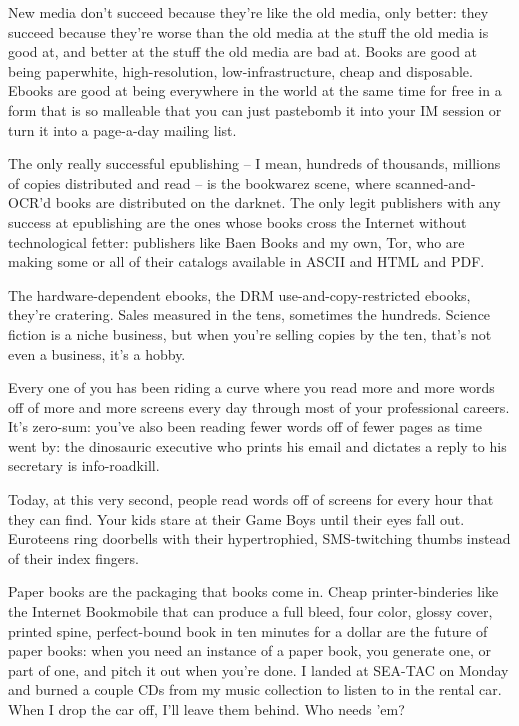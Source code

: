 New media don't succeed because they're like the old media, only
better: they succeed because they're worse than the old media at
the stuff the old media is good at, and better at the stuff the old
media are bad at. Books are good at being paperwhite,
high-resolution, low-infrastructure, cheap and disposable. Ebooks
are good at being everywhere in the world at the same time for free
in a form that is so malleable that you can just pastebomb it into
your IM session or turn it into a page-a-day mailing list.

The only really successful epublishing -- I mean, hundreds of
thousands, millions of copies distributed and read -- is the
bookwarez scene, where scanned-and-OCR'd books are distributed on
the darknet. The only legit publishers with any success at
epublishing are the ones whose books cross the Internet without
technological fetter: publishers like Baen Books and my own, Tor,
who are making some or all of their catalogs available in ASCII and
HTML and PDF.

The hardware-dependent ebooks, the DRM use-and-copy-re\-stricted
ebooks, they're cratering. Sales measured in the tens, sometimes
the hundreds. Science fiction is a niche business, but when you're
selling copies by the ten, that's not even a business, it's a
hobby.

Every one of you has been riding a curve where you read more and
more words off of more and more screens every day through most of
your professional careers. It's zero-sum: you've also been reading
fewer words off of fewer pages as time went by: the dinosauric
executive who prints his email and dictates a reply to his
secretary is info-roadkill.

Today, at this very second, people read words off of screens for
every hour that they can find. Your kids stare at their Game Boys
until their eyes fall out. Euroteens ring doorbells with their
hypertrophied, SMS-twitching thumbs instead of their index
fingers.

Paper books are the packaging that books come in. Cheap
printer-binderies like the Internet Bookmobile that can produce a
full bleed, four color, glossy cover, printed spine, perfect-bound
book in ten minutes for a dollar are the future of paper books:
when you need an instance of a paper book, you generate one, or
part of one, and pitch it out when you're done. I landed at SEA-TAC
on Monday and burned a couple CDs from my music collection to
listen to in the rental car. When I drop the car off, I'll leave
them behind. Who needs 'em?

